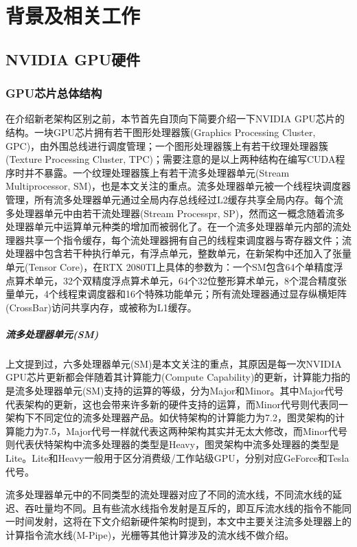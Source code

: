 \newpage
\setcounter{table}{0}
\setcounter{figure}{0}
\section{背景及相关工作}

\subsection{NVIDIA GPU硬件}
\subsubsection{GPU芯片总体结构} 
\par 在介绍新老架构区别之前，本节首先自顶向下简要介绍一下NVIDIA GPU芯片的结构。一块GPU芯片拥有若干图形处理器簇(Graphics Processing Cluster, GPC)，由外围总线进行调度管理；一个图形处理器簇上有若干纹理处理器簇(Texture Processing Cluster, TPC)；需要注意的是以上两种结构在编写CUDA程序时并不暴露。一个纹理处理器簇上有若干流多处理器单元(Stream Multiprocessor, SM)，也是本文关注的重点。流多处理器单元被一个线程块调度器管理，所有流多处理器单元通过全局内存总线经过L2缓存共享全局内存。每个流多处理器单元中由若干流处理器(Stream Processpr, SP)，然而这一概念随着流多处理器单元中运算单元种类的增加而被弱化了。在一个流多处理器单元内部的流处理器共享一个指令缓存，每个流处理器拥有自己的线程束调度器与寄存器文件；流处理器中包含若干种执行单元，有浮点单元，整数单元，在新架构中还加入了张量单元(Tensor Core)，在RTX 2080TI上具体的参数为：一个SM包含64个单精度浮点算术单元，32个双精度浮点算术单元，64个32位整形算术单元，8个混合精度张量单元，4个线程束调度器和16个特殊功能单元；所有流处理器通过显存纵横矩阵(CrossBar)访问共享内存，或被称为L1缓存\cite{EXPLORING}。
\subparagraph{流多处理器单元(SM)} 
\par 上文提到过，六多处理器单元(SM)是本文关注的重点，其原因是每一次NVIDIA GPU芯片更新都会伴随着其计算能力(Compute Capability)的更新，计算能力指的是流多处理器单元(SM)支持的运算的等级，分为Major和Minor。其中Major代号代表架构的更新，这也会带来许多新的硬件支持的运算，而Minor代号则代表同一架构下不同定位的流多处理器产品。如伏特架构的计算能力为7.2，图灵架构的计算能力为7.5，Major代号一样就代表这两种架构其实并无太大修改，而Minor代号则代表伏特架构中流多处理器的类型是Heavy，图灵架构中流多处理器的类型是Lite。Lite和Heavy一般用于区分消费级/工作站级GPU，分别对应GeForce和Tesla代号。
\par 流多处理器单元中的不同类型的流处理器对应了不同的流水线，不同流水线的延迟、吞吐量均不同。且有些流水线指令发射是互斥的，即互斥流水线的指令不能同一时间发射，这将在下文介绍新硬件架构时提到，本文中主要关注流多处理器上的计算指令流水线(M-Pipe)，光栅等其他计算涉及的流水线不做介绍。
